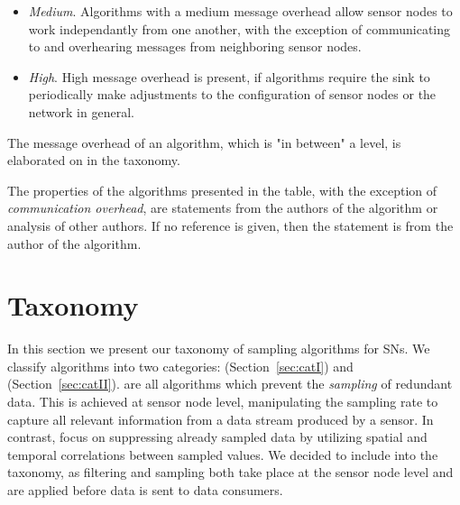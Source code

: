 \begin{description}
\begin{itemize}
            \item \textit{Medium}. Algorithms with a medium message overhead
            allow sensor nodes to work independantly from one another, with the
            exception of communicating to and overhearing messages from
            neighboring sensor nodes.

            \item \textit{High}. High message overhead is present, if
            algorithms require the sink to periodically make adjustments to
            the configuration of sensor nodes or the network in general.
        \end{itemize}

        The message overhead of an algorithm, which is "in between" a level, is
        elaborated on in the taxonomy.

        The properties of the algorithms presented in the table, with the
        exception of \textit{communication overhead}, are statements from the
        authors of the algorithm or analysis of other authors. If no reference
        is given, then the statement is from the author of the algorithm.

\end{description}


\section{Taxonomy}
\label{sec:Taxonomy}

In this section we present our taxonomy of sampling algorithms for \acp{SN}. We
classify algorithms into two categories: \catI (Section~\ref{sec:catI}) and
\catII (Section~\ref{sec:catII}). \catI are all algorithms which prevent the
\textit{sampling} of redundant data. This is achieved at sensor node level,
manipulating the sampling rate to capture all relevant information from a data
stream produced by a sensor. In contrast, \catII focus on suppressing already
sampled data by utilizing spatial and temporal correlations between sampled
values. We decided to include \catII into the taxonomy, as filtering and
sampling both take place at the sensor node level and are applied before data
is sent to data consumers.



